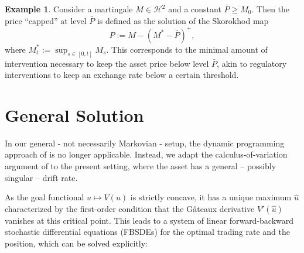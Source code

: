 \documentclass[11pt]{article}
\theoremstyle{definition}
\newtheorem{eg}[thm]{Example}
\theoremstyle{remark}
\begin{document}
\begin{eg}\label{ex:target}
Consider a martingale $M\in\mathcal{H}^2$ and a constant $\bar{P} \geq M_0$. Then the price ``capped'' at level $\bar{P}$ is defined as the solution of the Skorokhod map 
$$P:=M-(M^*-\bar{P})^+,$$
where $M^*_t:=\sup_{s\in[0,t]} M_s$. This corresponds to the minimal amount of intervention necessary to keep the asset price below level $\bar{P}$, akin to regulatory interventions to keep an exchange rate below a certain threshold.
\end{eg}


\section{General Solution}\label{s:result}

In our general - not necessarily Markovian - setup, the dynamic programming approach of \cite{lehalle2017incorporating} is no longer applicable. Instead, we adapt the calculus-of-variation argument of \cite{bank2017hedging,bouchard2017equilibrium} to the present setting, where the asset has a general -- possibly singular -- drift rate. 

As the goal functional $u\mapsto V(u)$ is strictly concave, it has a unique maximum $\hat{u}$ characterized by the first-order condition that the G\^ateaux derivative $V'(\hat{u})$ vanishes at this critical point. This leads to a system of linear forward-backward stochastic differential equations (FBSDEs) for the optimal trading rate and the position, which can be solved explicitly:
\end{document}
